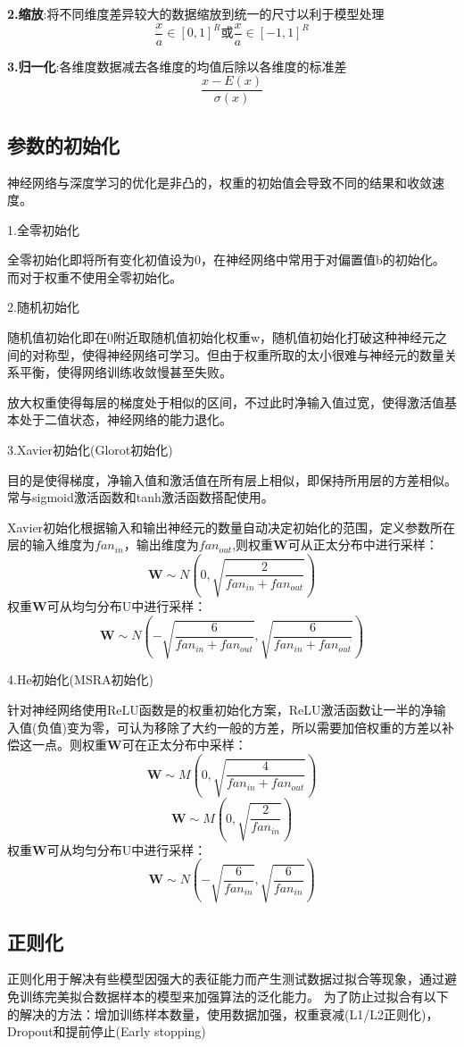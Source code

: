 \documentclass[openbib]{article}
\begin{document}
\textbf{2.缩放}:将不同维度差异较大的数据缩放到统一的尺寸以利于模型处理
$$\frac{x}{a}\in [0,1]^R \text{或} \frac{x}{a}\in [-1,1]^R$$

\textbf{3.归一化}:各维度数据减去各维度的均值后除以各维度的标准差$$\frac{x-E(x)}{\sigma(x)}$$
\subsection{参数的初始化}
神经网络与深度学习的优化是非凸的，权重的初始值会导致不同的结果和收敛速度。
\begin{center}
	1.全零初始化
\end{center}
全零初始化即将所有变化初值设为0，在神经网络中常用于对偏置值b的初始化。而对于权重不使用全零初始化。
\begin{center}
	2.随机初始化
\end{center}
随机值初始化即在0附近取随机值初始化权重w，随机值初始化打破这种神经元之间的对称型，使得神经网络可学习。但由于权重所取的太小很难与神经元的数量关系平衡，使得网络训练收敛慢甚至失败。

放大权重使得每层的梯度处于相似的区间，不过此时净输入值过宽，使得激活值基本处于二值状态，神经网络的能力退化。
\begin{center}
	3.Xavier初始化(Glorot初始化)
\end{center}
目的是使得梯度，净输入值和激活值在所有层上相似，即保持所用层的方差相似。常与sigmoid激活函数和tanh激活函数搭配使用。

Xavier初始化根据输入和输出神经元的数量自动决定初始化的范围，定义参数所在层的输入维度为$fan_{in}$，输出维度为$fan_{out}$,则权重\textbf{W}可从正太分布中进行采样：
$$\textbf{W}\sim N(0,\sqrt{\frac{2}{fan_{in}+fan_{out}}})$$
权重\textbf{W}可从均匀分布U中进行采样：
$$\textbf{W}\sim N(-\sqrt{\frac{6}{fan_{in}+fan_{out}}},\sqrt{\frac{6}{fan_{in}+fan_{out}}})$$
\begin{center}
	4.He初始化(MSRA初始化)
\end{center}
针对神经网络使用ReLU函数是的权重初始化方案，ReLU激活函数让一半的净输入值(负值)变为零，可认为移除了大约一般的方差，所以需要加倍权重的方差以补偿这一点。则权重\textbf{W}可在正太分布中采样：
$$\textbf{W}\sim M(0,\sqrt{\frac{4}{fan_{in}+fan_{out}}})$$
$$\textbf{W}\sim M(0,\sqrt{\frac{2}{fan_{in}}})$$
权重\textbf{W}可从均匀分布U中进行采样：
$$\textbf{W}\sim N(-\sqrt{\frac{6}{fan_{in}}},\sqrt{\frac{6}{fan_{in}}})$$
\subsection{正则化}
正则化用于解决有些模型因强大的表征能力而产生测试数据过拟合等现象，通过避免训练完美拟合数据样本的模型来加强算法的泛化能力。
为了防止过拟合有以下的解决的方法：增加训练样本数量，使用数据加强，权重衰减(L1/L2正则化)，Dropout和提前停止(Early stopping)
\end{document}

